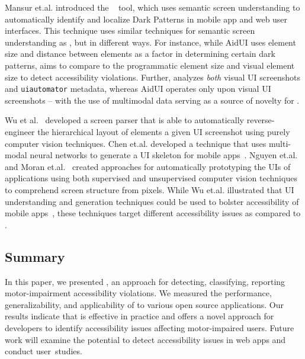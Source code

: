 Mansur et.al. introduced the \AidUI~\cite{mansur2023aidui} tool, which uses semantic screen understanding to automatically identify and localize Dark Patterns in mobile app and web user interfaces. This technique uses similar techniques for semantic screen understanding as \MotorEase, but in different ways. For instance, while AidUI uses element size and distance between elements as a factor in determining certain dark patterns, \MotorEase aims to compare to the programmatic element size and visual element size to detect accessibility violations. Further, \MotorEase analyzes \textit{both} visual UI screenshots and \texttt{\small uiautomator} metadata, whereas AidUI operates only upon visual UI screenshots -- with the use of multimodal data serving as a source of novelty for \MotorEase.

Wu et al.~\cite{Wu21} developed a screen parser that is able to automatically reverse-engineer the hierarchical layout of elements a given UI screenshot using purely computer vision techniques. Chen et.al. developed a technique that uses multi-modal neural networks to generate a UI skeleton for mobile apps~\cite{Chen18}. Nguyen et.al.~\cite{Nguyen:ASE'15} and Moran et.al.~\cite{Moran:TSE'18} created approaches for automatically prototyping the UIs of applications using both supervised and unsupervised computer vision techniques to comprehend screen structure from pixels. While Wu et.al. illustrated that UI understanding and generation techniques could be used to bolster accessibility of mobile apps~\cite{Wu21}, these techniques target different accessibility issues as compared to \MotorEase. \


\subsection{Summary}
In this paper, we presented \MotorEase, an approach for detecting, classifying, reporting motor-impairment accessibility violations. We measured the performance, generalizability, and  applicability of \MotorEase to various open source applications. Our results indicate that \MotorEase is effective in practice and offers a novel approach for developers to identify accessibility issues affecting motor-impaired users. Future work will examine the potential to detect accessibility issues in web apps and conduct user~studies.













